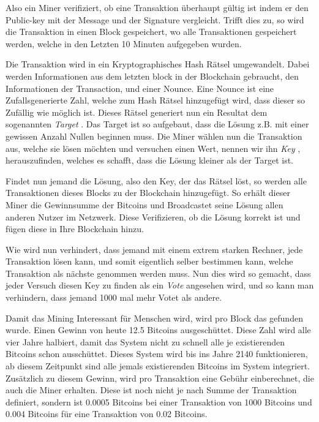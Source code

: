 \noindent
Also ein Miner verifiziert, ob eine Transaktion überhaupt gültig ist indem er den Public-key mit der Message und der Signature vergleicht. Trifft dies zu, so wird die Transaktion in einen Block gespeichert,
wo alle Transaktionen gespeichert werden, welche in den Letzten 10 Minuten aufgegeben wurden.

\noindent
Die Transaktion wird in ein Kryptographisches Hash Rätsel umgewandelt. Dabei werden Informationen aus dem letzten block in der Blockchain gebraucht, den Informationen der Transaction, und einer Nounce.
Eine Nounce ist eine Zufallsgenerierte Zahl, welche zum Hash Rätsel hinzugefügt wird, dass dieser so Zufällig wie möglich ist. Dieses Rätsel generiert nun ein Resultat dem sogenannten \emph{\dq Target \dq}.
Das Target ist so aufgebaut, dass die Lösung z.B. mit einer gewissen Anzahl Nullen beginnen muss. Die Miner wählen nun die Transaktion aus, welche sie lösen möchten und versuchen einen Wert, nennen wir ihn
\emph{\dq Key \dq}, herauszufinden, welches es schafft, dass die Lösung kleiner als der Target ist.

\noindent
Findet nun jemand die Lösung, also den Key, der das Rätsel löst, so werden alle Transaktionen dieses Blocks zu der Blockchain hinzugefügt. So erhält dieser Miner die Gewinnsumme der Bitcoins und Broadcastet
seine Lösung allen anderen Nutzer im Netzwerk. Diese Verifizieren, ob die Lösung korrekt ist und fügen diese in Ihre Blockchain hinzu.

\noindent
Wie wird nun verhindert, dass jemand mit einem extrem starken Rechner, jede Transaktion lösen kann, und somit eigentlich selber bestimmen kann, welche Transaktion als nächste genommen werden muss.
Nun dies wird so gemacht, dass jeder Versuch diesen Key zu finden als ein \emph{\dq Vote \dq} angesehen wird, und so kann man verhindern, dass jemand 1000 mal mehr Votet als andere.

\noindent
Damit das Mining Interessant für Menschen wird, wird pro Block das gefunden wurde. Einen Gewinn von heute 12.5 Bitcoins ausgeschüttet. Diese Zahl wird alle vier Jahre halbiert, damit das System nicht
zu schnell alle je existierenden Bitcoins schon ausschüttet. Dieses System wird bis ins Jahre 2140 funktionieren, ab diesem Zeitpunkt sind alle jemals existierenden Bitcoins im System integriert.
Zusätzlich zu diesem Gewinn, wird pro Transaktion eine Gebühr einberechnet, die auch die Miner erhalten. Diese ist noch nicht je nach Summe der Transaktion definiert, sondern ist 0.0005 Bitcoins bei
einer Transaktion von 1000 Bitcoins und 0.004 Bitcoins für eine Transaktion von 0.02 Bitcoins.


\newpage
